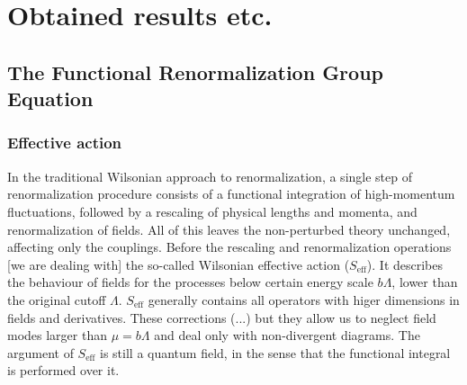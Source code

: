 \documentclass[11pt, a4paper]{article}
\begin{document}
\section*{Obtained results etc.}

\subsection{The Functional Renormalization Group Equation}

\subsubsection*{\centering Effective action}

In the traditional Wilsonian approach to renormalization, a single step of renormalization procedure consists of
a functional integration of high-momentum fluctuations, followed by a rescaling of physical lengths and momenta, and
renormalization of fields. All of this leaves the non-perturbed theory unchanged, affecting only the couplings.
Before the rescaling and renormalization operations [we are dealing with] the so-called Wilsonian effective action ($S_{\text{eff}}$).
It describes the behaviour of fields for the processes below certain energy scale $b\Lambda$, lower than the original cutoff $\Lambda$.
$S_{\text{eff}}$ generally contains all operators with higer dimensions in fields and derivatives.
These corrections (...) but they allow us to neglect field modes larger than $\mu = b\Lambda$ and deal only with non-divergent diagrams.
The argument of $S_{\text{eff}}$ is still a quantum field, in the sense that the functional integral is performed over it. %
\end{document}
